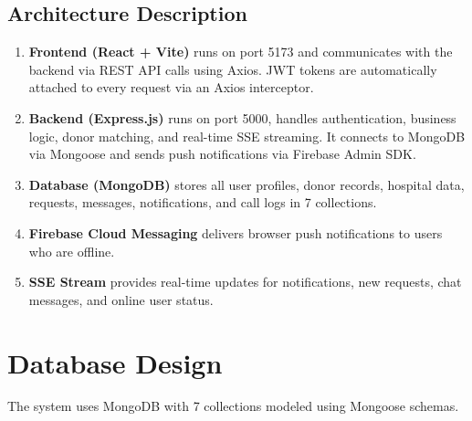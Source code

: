 \documentclass[12pt,a4paper]{article}
\begin{document}
\subsection{Architecture Description}

\begin{enumerate}[leftmargin=*]
    \item \textbf{Frontend (React + Vite)} runs on port 5173 and communicates with the backend via REST API calls using Axios. JWT tokens are automatically attached to every request via an Axios interceptor.
    \item \textbf{Backend (Express.js)} runs on port 5000, handles authentication, business logic, donor matching, and real-time SSE streaming. It connects to MongoDB via Mongoose and sends push notifications via Firebase Admin SDK.
    \item \textbf{Database (MongoDB)} stores all user profiles, donor records, hospital data, requests, messages, notifications, and call logs in 7 collections.
    \item \textbf{Firebase Cloud Messaging} delivers browser push notifications to users who are offline.
    \item \textbf{SSE Stream} provides real-time updates for notifications, new requests, chat messages, and online user status.
\end{enumerate}

\section{Database Design}

The system uses MongoDB with 7 collections modeled using Mongoose schemas.
\end{document}
